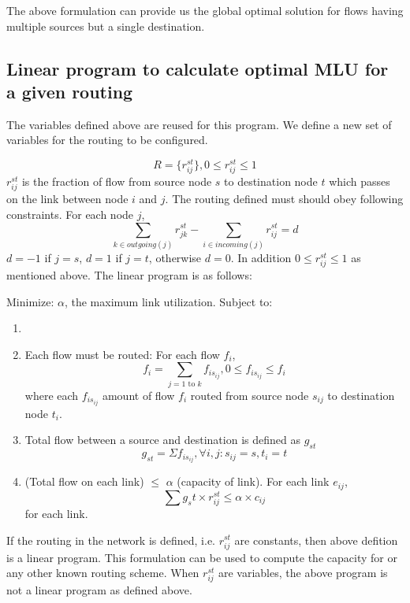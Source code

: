 The above formulation can provide us the global optimal solution for flows having multiple sources but a single destination.

\subsection{Linear program to calculate optimal MLU for a given routing}
The variables defined above are reused for this program. We define a new set of variables for the routing to be configured.

\[R = \{r_{ij}^{st}\}, 0 \leq r_{ij}^{st} \leq 1\]
$r_{ij}^{st}$ is the fraction of flow from source node $s$ to destination node $t$ which passes on the link between node $i$ and $j$. 
The routing defined must should obey following constraints. For each node $j$,
\[ \sum_{k \in outgoing(j)} r_{jk}^{st} - \sum_{i \in incoming(j)} r_{ij}^{st} = d\]
$d = -1$ if $j = s$, $d = 1$ if $j = t$, otherwise $d = 0$. In addition $0 \leq r_{ij}^{st} \leq 1$ as mentioned above. The linear program is as follows:

Minimize:  $\alpha$, the maximum link utilization.
Subject to:
\begin{enumerate}
\item \item 
Each flow must be routed: For each flow $f_i$,
\[ f_i = \sum_{j = 1 \mbox{ to }k }  f_{is_{ij}}, 0 \leq  f_{is_{ij}} \leq f_i \]
where each $f_{is_{ij}}$ amount of flow $f_i$ routed from source node $s_{ij}$ to destination node $t_i$. 


\item 
Total flow between a source and destination is defined as $g_{st}$
\[ g_{st} = \Sigma f_{is_{ij}},   \forall i,j : s_{ij} = s , t_i = t \]

\item
(Total flow on each link) $\leq $ $\alpha $ (capacity of link). For each link $e_{ij}$, 
\[ \sum g_st \times r_{ij}^{st} \leq \alpha \times c_{ij} \]
for each link.

\end{enumerate}

If the routing in the network is defined, i.e. $r_{ij}^{st}$ are constants, then above defition is a linear program. This formulation can be used to compute the capacity for \invcap{} or any other known routing scheme. When $r_{ij}^{st}$ are variables, the above program is not a linear program as defined above.






